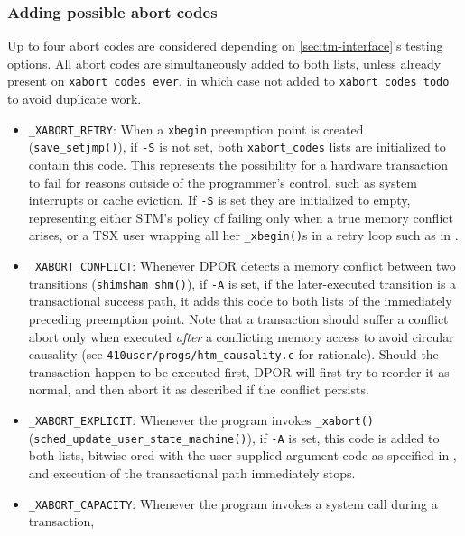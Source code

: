 \subsubsection{Adding possible abort codes}
\label{sec:txn-abort-codes}

Up to four abort codes are considered depending on \cref{sec:tm-interface}'s testing options.
All abort codes are simultaneously added to both lists,
unless already present on {\tt xabort\_codes\_ever},
in which case not added to {\tt xabort\_codes\_todo} to avoid duplicate work.
\begin{itemize}
	\item {\tt \_XABORT\_RETRY}:
		When a {\tt xbegin} preemption point is created ({\tt save\_setjmp()}),
		if {\tt -S} is not set,
		both {\tt xabort\_codes} lists are initialized to contain this code.
		This represents the possibility for a hardware transaction to fail
		for reasons outside of the programmer's control, such as system interrupts or cache eviction.
		If {\tt -S} is set they are initialized to empty,
		representing either STM's policy of failing only when a true memory conflict arises,
		or a TSX user wrapping all her {\tt \_xbegin()}s in a retry loop such as in \cite{sigbovik-htm}.
	\item {\tt \_XABORT\_CONFLICT}:
		Whenever DPOR detects a memory conflict between two transitions ({\tt shimsham\_shm()}),
		if {\tt -A} is set,
		if the later-executed transition is a transactional success path,
		it adds this code to both lists of the immediately preceding preemption point.
		Note that a transaction should suffer a conflict abort
		only when executed {\em after} a conflicting memory access
		to avoid circular causality
		(see {\tt 410user/progs/htm\_causality.c} for rationale).
		Should the transaction happen to be executed first,
		DPOR will first try to reorder it as normal,
		and then abort it as described if the conflict persists.
	\item {\tt \_XABORT\_EXPLICIT}:
		Whenever the program invokes {\tt \_xabort()} ({\tt sched\_update\_user\_\allowbreak{}state\_machine()}),
		if {\tt -A} is set,
		this code is added to both lists, bitwise-ored with the user-supplied argument code
		as specified in \cite{htm-gcc},
		and execution of the transactional path immediately stops.
	\item {\tt \_XABORT\_CAPACITY}:
		Whenever the program invokes a system call during a transaction,

\end{itemize}
